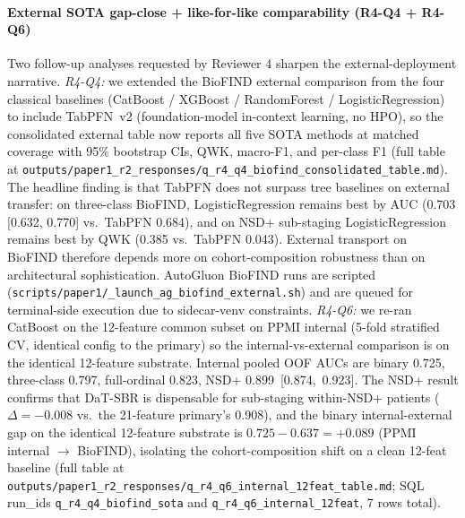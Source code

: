\paragraph*{External SOTA gap-close + like-for-like comparability (R4-Q4 + R4-Q6)} Two follow-up analyses requested by Reviewer 4 sharpen the external-deployment narrative. \textit{R4-Q4:} we extended the BioFIND external comparison from the four classical baselines (CatBoost / XGBoost / RandomForest / LogisticRegression) to include TabPFN~v2 (foundation-model in-context learning, no HPO), so the consolidated external table now reports all five SOTA methods at matched coverage with 95\% bootstrap CIs, QWK, macro-F1, and per-class F1 (full table at \texttt{outputs/paper1\_r2\_responses/q\_r4\_q4\_biofind\_consolidated\_table.md}). The headline finding is that TabPFN does not surpass tree baselines on external transfer: on three-class BioFIND, LogisticRegression remains best by AUC (0.703 [0.632, 0.770] vs.\ TabPFN 0.684), and on NSD+ sub-staging LogisticRegression remains best by QWK (0.385 vs.\ TabPFN 0.043). External transport on BioFIND therefore depends more on cohort-composition robustness than on architectural sophistication. AutoGluon BioFIND runs are scripted (\texttt{scripts/paper1/\_launch\_ag\_biofind\_external.sh}) and are queued for terminal-side execution due to sidecar-venv constraints. \textit{R4-Q6:} we re-ran CatBoost on the 12-feature common subset on PPMI internal (5-fold stratified CV, identical config to the primary) so the internal-vs-external comparison is on the identical 12-feature substrate. Internal pooled OOF AUCs are binary 0.725, three-class 0.797, full-ordinal 0.823, NSD+ 0.899~[0.874,~0.923]. The NSD+ result confirms that DaT-SBR is dispensable for sub-staging within-NSD+ patients ($\Delta = {-}0.008$ vs.\ the 21-feature primary's 0.908), and the binary internal-external gap on the identical 12-feature substrate is $0.725 - 0.637 = +0.089$ (PPMI internal $\to$ BioFIND), isolating the cohort-composition shift on a clean 12-feat baseline (full table at \texttt{outputs/paper1\_r2\_responses/q\_r4\_q6\_internal\_12feat\_table.md}; SQL run\_ids \texttt{q\_r4\_q4\_biofind\_sota} and \texttt{q\_r4\_q6\_internal\_12feat}, 7 rows total).

